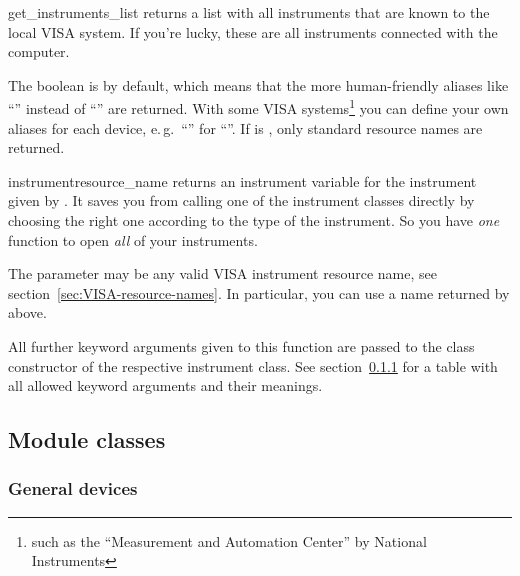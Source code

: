 \documentclass{howto}
\begin{document}
\begin{funcdesc}{get_instruments_list}{}
  returns a list with all instruments that are known to the local VISA system.
  If you're lucky, these are all instruments connected with the computer.

  The boolean  is  by default, which means that the
  more human-friendly aliases like ``'' instead of ``''
  are returned.  With some VISA systems\footnote{such as the ``Measurement and
    Automation Center'' by National Instruments} you can define your own
  aliases for each device, e.\,g.\ ``'' for
  ``''.  If  is , only
  standard resource names are returned.
\end{funcdesc}

\begin{funcdesc}{instrument}{resource_name}
  returns an instrument variable for the instrument given by
  .  It saves you from calling one of the instrument classes
  directly by choosing the right one according to the type of the instrument.
  So you have \emph{one} function to open \emph{all} of your instruments.

  The parameter  may be any valid VISA instrument resource
  name, see section~\ref{sec:VISA-resource-names}.  In particular, you can use
  a name returned by  above.

  All further keyword arguments given to this function are passed to the class
  constructor of the respective instrument class.  See
  section~\ref{sec:general-devices} for a table with all allowed keyword
  arguments and their meanings.
\end{funcdesc}


\subsection{Module classes}


\subsubsection{General devices}
\label{sec:general-devices}
\end{document}
